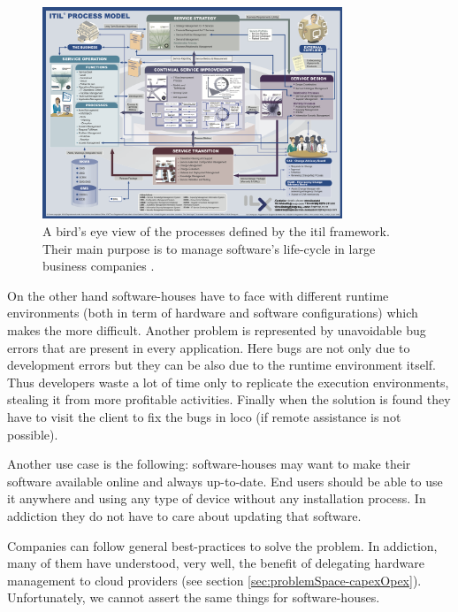 \begin{figure}
	\centering{}
	\includegraphics[width=0.8\textwidth]{chapters/problem/images/itil-map.png}
	\caption[\acs{itil} v3 process model]{A bird's eye view of the processes defined by the \acf{itil} 
		framework. Their main purpose is to manage software's life-cycle in large business companies
		\cite{itilProcessModel}.}
	\label{img:problemSpace-useCases-itilProcessModel}
\end{figure}

On the other hand software-houses have to face with different runtime environments (both in term of
hardware and software configurations) which makes the  more difficult.
Another problem is represented by unavoidable bug errors that are present in every application. Here
bugs are not only due to development errors but they can be also due to the runtime environment itself.
Thus developers waste a lot of time only to replicate the execution environments, stealing it from
more profitable activities. Finally when the solution is found they have to visit the client to fix
the bugs in loco (if remote assistance is not possible).

Another use case is the following: software-houses may want to make their software available online
and always up-to-date. End users should be able to use it anywhere and using any type of device without
any installation process. In addiction they do not have to care about updating that software.

Companies can follow general best-practices to solve the problem. In addiction, many of them have
understood, very well, the benefit of delegating hardware management to cloud providers (see section
\ref{sec:problemSpace-capexOpex}). Unfortunately, we cannot assert the same things for software-houses.


